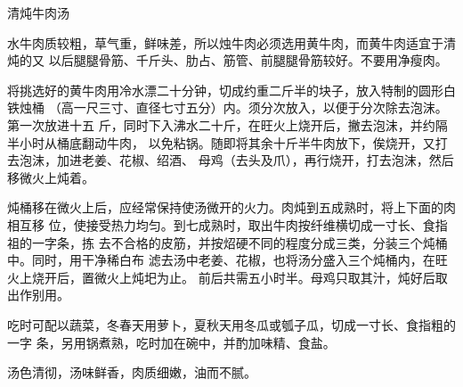 \begin{recipe}{清炖牛肉汤}

\ingredients


\cooking

水牛肉质较粗，草气重，鲜味差，所以烛牛肉必须选用黄牛肉，而黄牛肉适宜于清炖的又
以后腿腿骨筋、千斤头、肋占、筋管、前腿腿骨筋较好。不要用净瘦肉。

将挑选好的黄牛肉用冷水漂二十分钟，切成约重二斤半的块子，放入特制的圆形白铁烛桶
（高一尺三寸、直径七寸五分）内。须分次放入，以便于分次除去泡沫。第一次放进十五
斤，同时下入沸水二十斤，在旺火上烧开后，撇去泡沫，并约隔半小时从桶底翻动牛肉，
以免粘锅。随即将其余十斤半牛肉放下，俟烧开，又打去泡沫，加进老姜、花椒、绍酒、
母鸡（去头及爪），再行烧开，打去泡沫，然后移微火上炖着。

炖桶移在微火上后，应经常保持使汤微开的火力。肉炖到五成熟时，将上下面的肉相互移
位，使接受热力均匀。到七成熟时，取出牛肉按纤维横切成一寸长、食指祖的一字条，拣
去不合格的皮筋，并按炤硬不同的程度分成三类，分装三个炖桶中。同时，用干净稀白布
滤去汤中老姜、花椒，也将汤分盛入三个炖桶内，在旺火上烧开后，置微火上炖圯为止。
前后共需五小时半。母鸡只取其汁，炖好后取出作别用。

吃时可配以蔬菜，冬春天用萝卜，夏秋天用冬瓜或瓠子瓜，切成一寸长、食指粗的一字
条，另用锅煮熟，吃时加在碗中，并酌加味精、食盐。

\features

汤色清彻，汤味鲜香，肉质细嫩，油而不腻。

\end{recipe}

